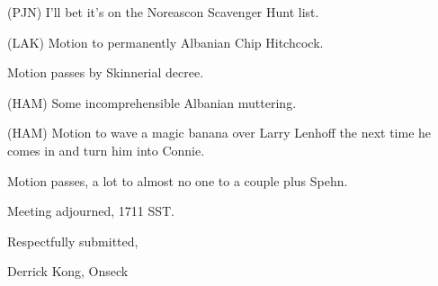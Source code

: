 \documentclass[12pt]{article}
\begin{document}
(PJN) I'll bet it's on the Noreascon Scavenger Hunt list.

(LAK) Motion to permanently Albanian Chip Hitchcock.

Motion passes by Skinnerial decree.

(HAM) Some incomprehensible Albanian muttering.

(HAM) Motion to wave a magic banana over Larry Lenhoff the next time he comes in and turn him into Connie.

Motion passes, a lot to almost no one to a couple plus Spehn.

\vspace{12pt}

\noindent
Meeting adjourned, 1711 SST.

\vspace{18pt}

\centerline{Respectfully submitted,}
\centerline{Derrick Kong, Onseck}
\end{document}
